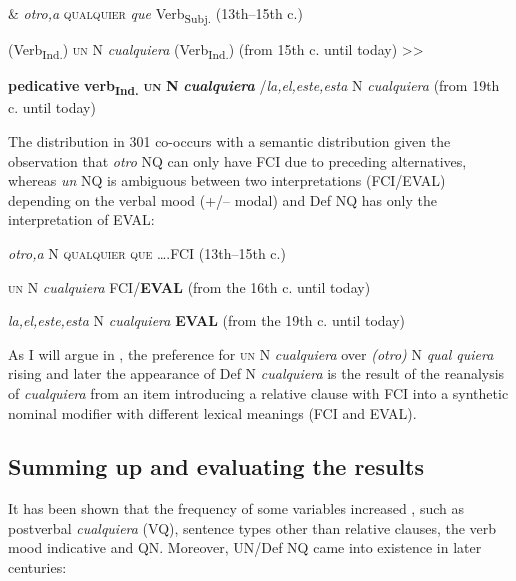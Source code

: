   \& \textit{otro,a} \textsc{qualquier} \textit{que} Verb\textsubscript{Subj.} (13th–15th c.) 

    (Verb\textsubscript{Ind.}) \textsc{un} N \textit{cualquiera} (Verb\textsubscript{Ind.}) (from 15th c. until today) >>

   \textbf{pedicative} \textbf{verb\textsubscript{Ind.}} \textbf{\textsc{un}} \textbf{N} \textbf{\textit{cualquiera}} /\textit{la,el,este,esta} N \textit{cualquiera} (from 19th c. until today)

The distribution in 301 co-occurs with a semantic distribution given the observation that \textit{otro} NQ can only have FCI due to preceding alternatives, whereas \textit{un} NQ is ambiguous between two interpretations (FCI/EVAL) depending on the verbal mood (+/– modal) and Def NQ has only the interpretation of EVAL:

  \textit{otro,a} N \textsc{qualquier} \textsc{que} ….FCI (13th–15th c.) 

      \textsc{un} N \textit{cualquiera} FCI/\textbf{EVAL} (from the 16th c. until today) 

   \textit{la,el,este,esta} N \textit{cualquiera} \textbf{EVAL} (from the 19th c. until today)

As I will argue in , the preference for \textsc{un} N \textit{cualquiera} over \textit{(otro)} N \textit{qual quiera} rising and later the appearance of Def N \textit{cualquiera} is the result of the reanalysis of \textit{cualquiera} from an item introducing a relative clause with FCI into a synthetic nominal modifier with different lexical meanings (FCI and EVAL). 

\subsection{Summing up and evaluating the results}

It has been shown that the frequency of some variables increased , such as postverbal \textit{cualquiera} (VQ), sentence types other than relative clauses, the verb mood indicative and QN. Moreover, UN/Def NQ came into existence in later centuries:


